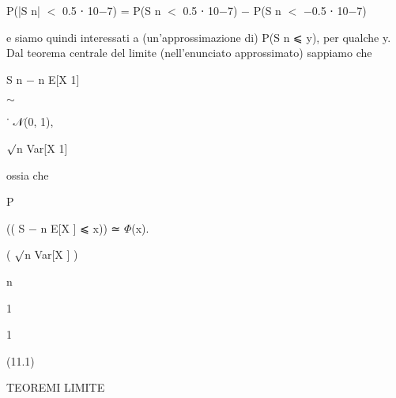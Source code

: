 \documentclass[a4paper,portrait,12pt]{article}
\begin{document}
\begin{flushleft}
P(|S n| $<$ 0.5 ⋅ 10$-$7) = P(S n $<$ 0.5 ⋅ 10$-$7) $-$ P(S n $<$ $-$0.5 ⋅ 10$-$7)
\end{flushleft}


\begin{flushleft}
e siamo quindi interessati a (un'approssimazione di) P(S n ⩽ y), per qualche y. Dal teorema centrale del limite (nell'enunciato approssimato) sappiamo che
\end{flushleft}


\begin{flushleft}
S n $-$ n E[X 1]
\end{flushleft}


$\sim$


\begin{flushleft}
˙ 𝒩(0, 1),
\end{flushleft}


\begin{flushleft}
$\surd$n Var[X 1]
\end{flushleft}





\begin{flushleft}
ossia che
\end{flushleft}


\begin{flushleft}
P
\end{flushleft}





\begin{flushleft}
(( S $-$ n E[X ] ⩽ x)) ≃ $\Phi$(x).
\end{flushleft}


\begin{flushleft}
( $\surd$n Var[X ] )
\end{flushleft}


\begin{flushleft}
n
\end{flushleft}





1





1





(11.1)





\begin{flushleft}
 TEOREMI LIMITE
\end{flushleft}
\end{document}
